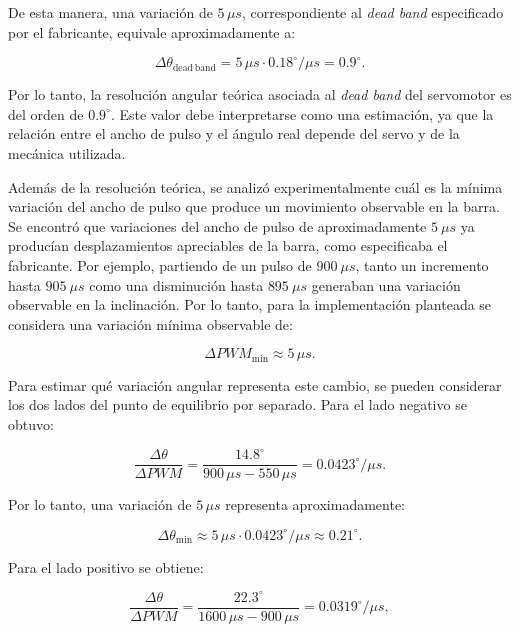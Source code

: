 \documentclass[a4paper, twoside, 10pt, spanish]{article}
\numberwithin{table}{section}
\begin{document}
De esta manera, una variación de $5\,\mu s$, correspondiente al
\textit{dead band} especificado por el fabricante, equivale
aproximadamente a:

\begin{equation*}
\Delta\theta_{\mathrm{dead\,band}}
=
5\,\mu s \cdot 0.18^\circ/\mu s
=
0.9^\circ.
\end{equation*}

Por lo tanto, la resolución angular teórica asociada al \textit{dead band}
del servomotor es del orden de $0.9^\circ$. Este valor debe interpretarse
como una estimación, ya que la relación entre el ancho de pulso y el ángulo
real depende del servo y de la mecánica utilizada.

Además de la resolución teórica, se analizó experimentalmente cuál es la
mínima variación del ancho de pulso que produce un movimiento observable
en la barra. Se encontró que variaciones del ancho de pulso de aproximadamente $5 \ \mu s$ ya producían desplazamientos apreciables de la barra, como especificaba el fabricante. Por ejemplo, partiendo de un pulso de $900 \ \mu s$, tanto un incremento hasta $905 \ \mu s$ como una disminución hasta $895 \ \mu s$ generaban una variación observable en la inclinación. Por lo tanto, para la implementación planteada se considera una variación
mínima observable de:

\begin{equation*}
\Delta PWM_{\min} \approx 5\,\mu s.
\end{equation*}

Para estimar qué variación angular representa este cambio, se pueden
considerar los dos lados del punto de equilibrio por separado. Para el
lado negativo se obtuvo:

\begin{equation*}
\frac{\Delta\theta}{\Delta PWM}
=
\frac{14.8^\circ}{900\,\mu s-550\,\mu s}
=
0.0423^\circ/\mu s.
\end{equation*}

Por lo tanto, una variación de $5\,\mu s$ representa aproximadamente:

\begin{equation*}
\Delta\theta_{\min}
\approx
5\,\mu s \cdot 0.0423^\circ/\mu s
\approx
0.21^\circ.
\end{equation*}

Para el lado positivo se obtiene:

\begin{equation*}
\frac{\Delta\theta}{\Delta PWM}
=
\frac{22.3^\circ}{1600\,\mu s-900\,\mu s}
=
0.0319^\circ/\mu s,
\end{equation*}
\end{document}
